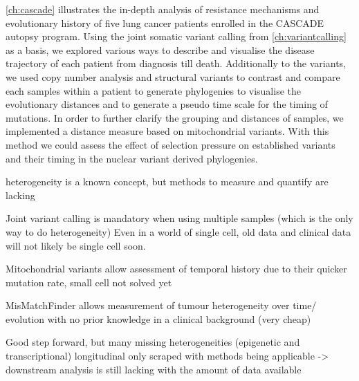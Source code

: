 \autoref{ch:cascade} illustrates the in-depth analysis of resistance mechanisms and evolutionary history of five lung cancer patients enrolled in the CASCADE autopsy program. Using the joint somatic variant calling from \autoref{ch:variantcalling} as a basis, we explored various ways to describe and visualise the disease trajectory of each patient from diagnosis till death. Additionally to the variants, we used copy number analysis and structural variants to contrast and compare each samples within a patient to generate phylogenies to visualise the evolutionary distances and to generate a pseudo time scale for the timing of mutations. In order to further clarify the grouping and distances of samples, we implemented a distance measure based on mitochondrial variants. With this method we could assess the effect of selection pressure on established variants and their timing in the nuclear variant derived phylogenies.


heterogeneity is a known concept, but methods to measure and quantify are lacking

Joint variant calling is mandatory when using multiple samples (which is the only way to do heterogeneity)
Even in a world of single cell, old data and clinical data will not likely be single cell soon.

Mitochondrial variants allow assessment of temporal history due to their quicker mutation rate, small cell not solved yet

MisMatchFinder allows measurement of tumour heterogeneity over time/ evolution with no prior knowledge in a clinical background (very cheap)

Good step forward, but many missing heterogeneities (epigenetic and transcriptional) longitudinal only scraped with methods being applicable -> downstream analysis is still lacking with the amount of data available 